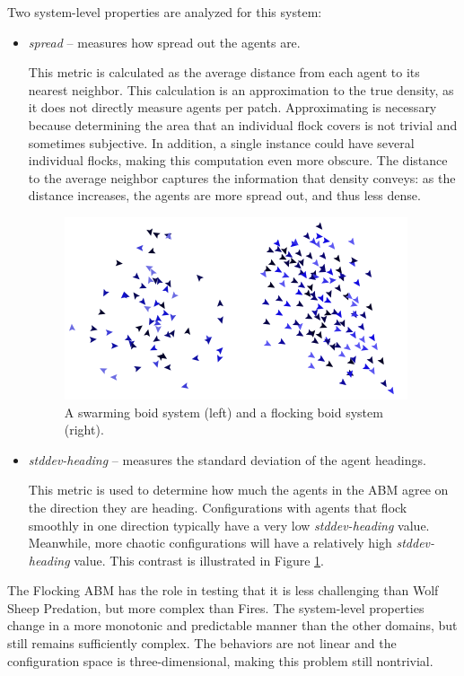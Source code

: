 Two system-level properties are analyzed for this system:
\begin{itemize}
\item \textit{spread} -- measures how spread out the agents are.

This metric is calculated as the average distance from each agent to its nearest neighbor.
This calculation is an approximation to the true density, as it does not directly measure agents per patch.
Approximating is necessary because determining the area that an individual flock covers is not trivial and sometimes subjective.
In addition, a single instance could have several individual flocks, making this computation even more obscure.
The distance to the average neighbor captures the information that density conveys: as the distance increases, the agents are more spread out, and thus less dense.

\begin{figure}[ht]
\centering
\includegraphics[scale=1]{images/swarmVSflock.png}
\caption{A swarming boid system (left) and a flocking boid system (right).}
\label{fig:swarmVSflock}
\end{figure}

\item \textit{stddev-heading} -- measures the standard deviation of the agent headings.

This metric is used to determine how much the agents in the ABM agree on the direction they are heading.
Configurations with agents that flock smoothly in one direction typically have a very low \textit{stddev-heading} value.
Meanwhile, more chaotic configurations will have a relatively high \textit{stddev-heading} value.
This contrast is illustrated in Figure \ref{fig:swarmVSflock}.

\end{itemize}

The Flocking ABM has the role in testing \fw that it is less challenging than Wolf Sheep Predation, but more complex than Fires.
The system-level properties change in a more monotonic and predictable manner than the other domains, but still remains sufficiently complex.
The behaviors are not linear and the configuration space is three-dimensional, making this problem still nontrivial. 

